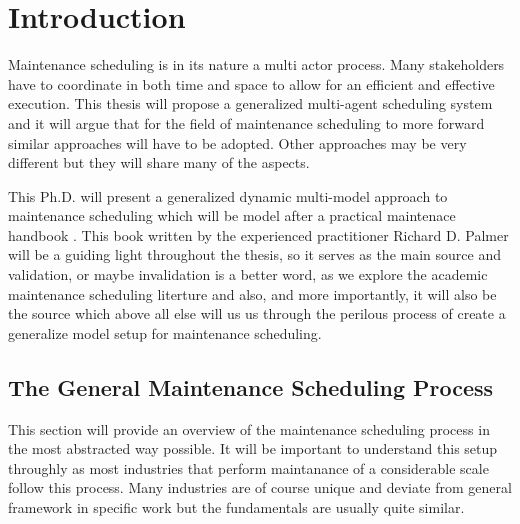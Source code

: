 \chapter{Introduction}
Maintenance scheduling is in its nature a multi actor process. Many stakeholders have to coordinate in both time and space to allow for an
efficient and effective execution. This thesis will propose a generalized multi-agent scheduling system and it will argue that for the field of
maintenance scheduling to more forward similar approaches will have to be adopted. Other approaches may be very different but they will share many 
of the aspects. 

This Ph.D. will present a generalized dynamic multi-model approach to maintenance scheduling which will be model after a practical maintenace handbook \cite{palmer_maintenance_2019}.
This book written by the experienced practitioner Richard D. Palmer will be a guiding light throughout the thesis, so it serves as the main source and validation, 
or maybe invalidation is a better word, as we explore the academic maintenance scheduling literture and also, and more importantly, it will also be the source 
which above all else will us us through the perilous process of create a generalize model setup for maintenance scheduling.



\section{The General Maintenance Scheduling Process}
This section will provide an overview of the maintenance scheduling process in the most abstracted way possible. It will be important to understand this setup
throughly as most industries that perform maintanance of a considerable scale follow this process. Many industries are of course unique and deviate
from general framework in specific work but the fundamentals are usually quite similar. 

